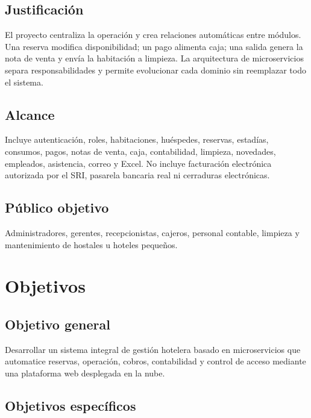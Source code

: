 \documentclass[12pt,a4paper]{article}
\begin{document}
\subsection{Justificación}

El proyecto centraliza la operación y crea relaciones automáticas entre módulos. Una reserva modifica disponibilidad; un pago alimenta caja; una salida genera la nota de venta y envía la habitación a limpieza. La arquitectura de microservicios separa responsabilidades y permite evolucionar cada dominio sin reemplazar todo el sistema.

\subsection{Alcance}

Incluye autenticación, roles, habitaciones, huéspedes, reservas, estadías, consumos, pagos, notas de venta, caja, contabilidad, limpieza, novedades, empleados, asistencia, correo y Excel. No incluye facturación electrónica autorizada por el SRI, pasarela bancaria real ni cerraduras electrónicas.

\subsection{Público objetivo}

Administradores, gerentes, recepcionistas, cajeros, personal contable, limpieza y mantenimiento de hostales u hoteles pequeños.

\section{Objetivos}

\subsection{Objetivo general}

Desarrollar un sistema integral de gestión hotelera basado en microservicios que automatice reservas, operación, cobros, contabilidad y control de acceso mediante una plataforma web desplegada en la nube.

\subsection{Objetivos específicos}
\end{document}
